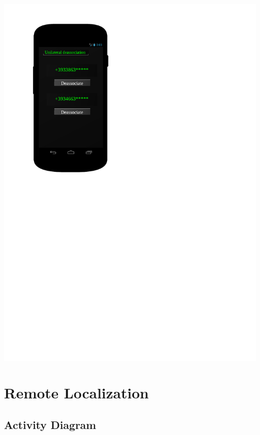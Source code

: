 \includegraphics[scale=0.7]{images/DeassociationAndroid}

\section{Remote Localization}

\newpage
\subsection{Activity Diagram}

